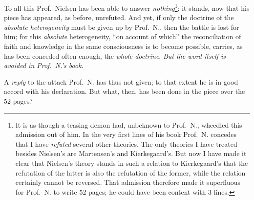\documentclass[12pt,a4paper]{book}
\begin{document}
To all this Prof.\ Nielsen has been able to answer \emph{nothing}\footnote{%
  It is as though a teasing demon had, unbeknown to Prof.\ N., wheedled this
  admission out of him. In the very first lines of his book Prof.\ N. concedes
  that I have \emph{refuted} several other theories. The only theories I have
  treated besides Nielsen's are Martensen's and Kierkegaard's. But now I have
  made it clear that Nielsen's theory stands in such a relation to
  Kierkegaard's that the refutation of the latter is also the refutation of the
  former, while the relation certainly cannot be reversed. That admission
  therefore made it superfluous for Prof.\ N. to write 52 pages; he could have
  been content with 3 lines.}:
\setcounter{footnote}{0}%
it stands, now that his piece has appeared, as before, unrefuted. And yet, if
only the doctrine of the \emph{absolute heterogeneity} must be given up by
Prof.\ N., then the battle is lost for him; for this \emph{absolute}
heterogeneity, ``on account of which'' the reconciliation of faith and
knowledge in the same consciousness is to become possible, carries, as has been
conceded often enough, the \emph{whole doctrine}. \emph{But the word itself is
avoided in Prof.\ N.'s book.}

A \emph{reply} to the attack Prof.\ N. has thus not given; to that extent he is
in good accord with his declaration. But what, then, has been done in the piece
over the 52 pages?
\end{document}
